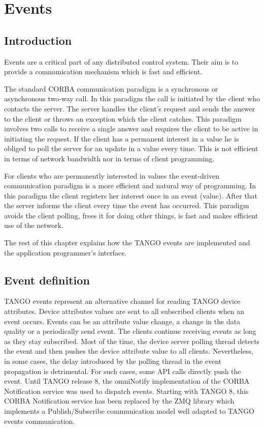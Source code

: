 \section{Events}

\subsection{Introduction}

Events are a critical part of any distributed control system. Their
aim is to provide a communication mechanism which is fast and efficient. 

The standard CORBA communication paradigm is a synchronous or asynchronous
two-way call. In this paradigm the call is initiated by the client
who contacts the server. The server handles the client's request and
sends the answer to the client or throws an exception which the client
catches. This paradigm involves two calls to receive a single answer
and requires the client to be active in initiating the request. If
the client has a permanent interest in a value he is obliged to poll
the server for an update in a value every time. This is not efficient
in terms of network bandwidth nor in terms of client programming.

For clients who are permanently interested in values the event-driven
communication paradigm is a more efficient and natural way of programming.
In this paradigm the client registers her interest once in an event
(value). After that the server informs the client every time the event
has occurred. This paradigm avoids the client polling, frees it for
doing other things, is fast and makes efficient use of the network.

The rest of this chapter explains how the TANGO events are implemented
and the application programmer's interface.

\subsection{Event definition}

TANGO events represent an alternative channel for reading TANGO device
attributes. Device attributes values are sent to
all subscribed clients when an event occurs. Events can be an attribute
value change, a change in the data quality or a periodically send
event. The clients continue receiving events as long as they stay
subscribed. Most of the time, the device server polling thread detects
the event and then pushes the device attribute value to all clients.
Nevertheless, in some cases, the delay introduced by the polling thread
in the event propagation is detrimental. For such cases, some API
calls directly push the event. Until TANGO release 8, the omniNotify
implementation of the CORBA Notification service
was used to dispatch events. Starting with TANGO 8, this CORBA Notification
service has been replaced by the ZMQ library which implements
a Publish/Subscribe communication model well adapted to TANGO events
communication.

